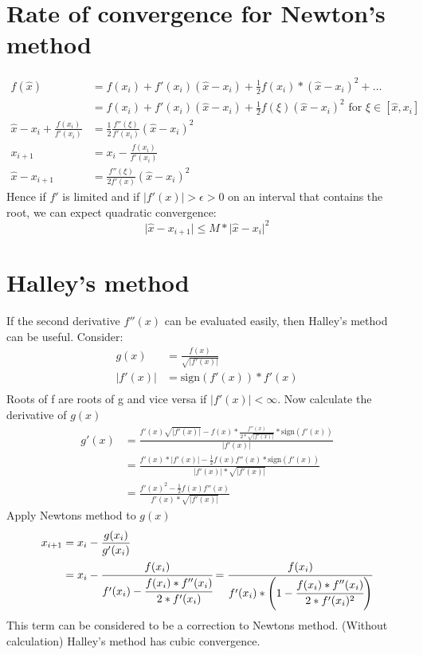 \section{Rate of convergence for Newton's method}\label{sec:rate-of-convergence-for-newton's-method}
\begin{align*}
    f(\hat{x}) &= f(x_i) + f'(x_i)(\hat{x}-x_i)+\frac{1}{2}f(x_i)*(\hat{x}-x_i)^2+\ldots\\
    &=f(x_i)+f'(x_i)(\hat{x}-x_i)+\frac{1}{2}f(\xi)(\hat{x}-x_i)^2 \text{ for }\xi \in [\hat{x}, x_i]\\
    \hat{x}-x_i+\frac{f(x_i)}{f'(x_i)} &= \frac{1}{2} \frac{f''(\xi)}{f'(x_i)}(\hat{x}-x_i)^2\\
    x_{i+1}&=x_i-\frac{f(x_i)}{f'(x_i)}\\
    \hat{x}-x_{i+1}&=\frac{f''(\xi)}{2f'(x)}(\hat{x}-x_i)^2
\end{align*}
Hence if $f'$ is limited and if $\lvert f'(x) \rvert>\epsilon >0$ on an interval that contains the root,
we can expect quadratic convergence:
\begin{equation*}
    \lvert \hat{x}-x_{i+1} \rvert \leq M * \lvert \hat{x}-x_i \rvert^2
\end{equation*}


\section{Halley's method}\label{sec:halleys-method}
If the second derivative $f''(x)$ can be evaluated easily, then Halley's method can be useful.
Consider:
\begin{align*}
    g(x)&= \frac{f(x)}{\sqrt {\lvert f'(x) \rvert}}\\
    \lvert f'(x) \rvert &= \text{sign}(f'(x))*f'(x)\\
\end{align*}
Roots of f are roots of g and vice versa if $\lvert f'(x) \rvert < \infty$.
Now calculate the derivative of $g(x)$
\begin{align*}
    g'(x) &= \frac{f'(x) \sqrt{\lvert f'(x) \rvert}-f(x)*\frac{f''(x)}{2*\sqrt{\lvert f'(x) \rvert}}*\text{sign}(f'(x))}
    {\lvert f'(x) \rvert}\\
    &=\frac{f'(x)* \lvert f'(x) \rvert - \frac{1}{2} f(x)f''(x)*\text{sign}(f'(x))}{\lvert f'(x) \rvert * \sqrt {\lvert f'(x) \rvert}}\\
    &=\frac{f'(x)^2- \frac{1}{2}f(x)f''(x)}{f'(x)*\sqrt{\lvert f'(x) \rvert}}
\end{align*}
Apply Newtons method to $g(x)$
\begin{align*}
    x_{i+1} &= x_{i}- \frac{g(x_i)}{g'(x_i)}\\
    &=x_i-\cfrac{f(x_i)}{f'(x_i)-\cfrac{f(x_i)*f''(x_i)}{2*f'(x_i)}}=\cfrac{f(x_i)}{f'(x_i)*\left(1-\cfrac{f(x_i)*f''(x_i)}{2*f'(x_i)^2}\right)}
\end{align*}
This term can be considered to be a correction to Newtons method.
(Without calculation) Halley's method has cubic convergence.


